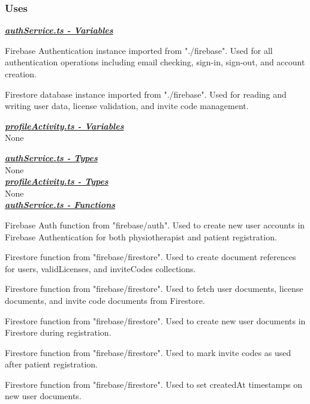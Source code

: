\documentclass[12pt, titlepage]{article}
\begin{document}
\subsubsection{Uses}

\noindent \underline{\textbf{\textit{authService.ts - Variables}}}
\begin{description}[style=nextline, leftmargin=2.5cm]
\item[\texttt{auth}] 
    Firebase Authentication instance imported from "./firebase". Used for all authentication operations including email checking, sign-in, sign-out, and account creation.

\item[\texttt{db}] 
    Firestore database instance imported from "./firebase". Used for reading and writing user data, license validation, and invite code management.
\end{description}

\noindent \underline{\textbf{\textit{profileActivity.ts - Variables}}}\\
None

\noindent \underline{\textbf{\textit{authService.ts - Types}}}\\
None\\
\noindent \underline{\textbf{\textit{profileActivity.ts - Types}}}\\
None\\


\noindent \underline{\textbf{\textit{authService.ts - Functions}}}
\begin{description}[style=nextline, leftmargin=2.5cm]
\item[\texttt{createUserWithEmailAndPassword}] 
    Firebase Auth function from "firebase/auth". Used to create new user accounts in Firebase Authentication for both physiotherapist and patient registration.

\item[\texttt{doc}] 
    Firestore function from "firebase/firestore". Used to create document references for users, validLicenses, and inviteCodes collections.

\item[\texttt{getDoc}] 
    Firestore function from "firebase/firestore". Used to fetch user documents, license documents, and invite code documents from Firestore.

\item[\texttt{setDoc}] 
    Firestore function from "firebase/firestore". Used to create new user documents in Firestore during registration.

\item[\texttt{updateDoc}] 
    Firestore function from "firebase/firestore". Used to mark invite codes as used after patient registration.

\item[\texttt{serverTimestamp}] 
    Firestore function from "firebase/firestore". Used to set createdAt timestamps on new user documents.
\end{description}
\end{document}
